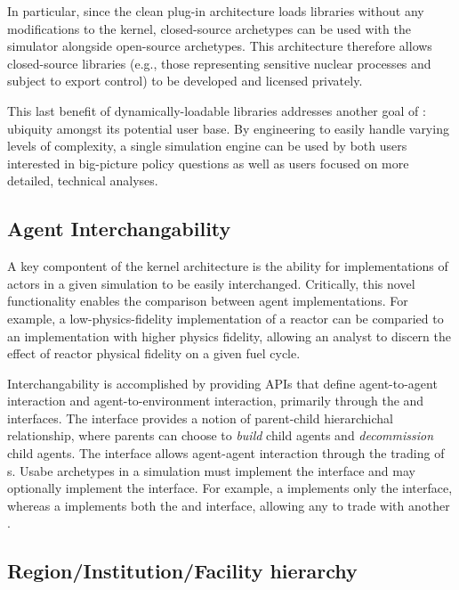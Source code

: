 In particular, since the clean plug-in architecture loads libraries without any
modifications to the \Cyclus kernel, closed-source archetypes can be used with
the simulator alongside open-source archetypes. This architecture therefore
allows closed-source libraries (e.g., those representing sensitive nuclear
processes and subject to export control) to be developed and licensed privately.

This last benefit of dynamically-loadable libraries addresses
another goal of \Cyclus: ubiquity amongst its potential user base. By
engineering \Cyclus to easily handle varying levels of complexity, a single
simulation engine can be used by both users interested in big-picture policy
questions as well as users focused on more detailed, technical
analyses.

\subsection{Agent Interchangability}

A key compontent of the \Cyclus kernel architecture is the ability for
implementations of actors in a given simulation to be easily
interchanged. Critically, this novel functionality enables the comparison
between agent implementations. For example, a low-physics-fidelity
implementation of a reactor can be comparied to an implementation with higher
physics fidelity, allowing an analyst to discern the effect of reactor physical
fidelity on a given fuel cycle. 

Interchangability is accomplished by providing APIs that define agent-to-agent
interaction and agent-to-environment interaction, primarily through the
 and  interfaces. The  interface
provides a notion of parent-child hierarchichal relationship, where parents can
choose to \textit{build} child agents and \textit{decommission} child
agents. The  interface allows agent-agent interaction through the
trading of s. Usabe archetypes in a \Cyclus simulation must
implement the  interface and may optionally implement the
 interface. For example, a  implements only the
 interface, whereas a  implements both the
 and  interface, allowing any  to
trade with another .

\subsection{Region/Institution/Facility hierarchy}

